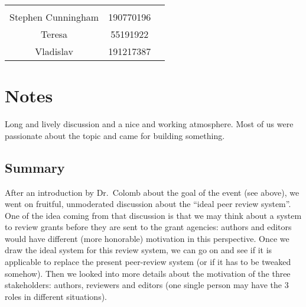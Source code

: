 \documentclass[]{article}
\begin{document}
\begin{longtable}[c]{@{}ccc@{}}
\begin{minipage}[t]{0.13\columnwidth}\centering\strut
\strut\end{minipage}\tabularnewline
\begin{minipage}[t]{0.24\columnwidth}\centering\strut
Stephen Cunningham
\strut\end{minipage} &
\begin{minipage}[t]{0.13\columnwidth}\centering\strut
190770196
\strut\end{minipage} &
\begin{minipage}[t]{0.13\columnwidth}\centering\strut
\strut\end{minipage}\tabularnewline
\begin{minipage}[t]{0.24\columnwidth}\centering\strut
Teresa
\strut\end{minipage} &
\begin{minipage}[t]{0.13\columnwidth}\centering\strut
55191922
\strut\end{minipage} &
\begin{minipage}[t]{0.13\columnwidth}\centering\strut
\strut\end{minipage}\tabularnewline
\begin{minipage}[t]{0.24\columnwidth}\centering\strut
Vladislav
\strut\end{minipage} &
\begin{minipage}[t]{0.13\columnwidth}\centering\strut
191217387
\strut\end{minipage} &
\begin{minipage}[t]{0.13\columnwidth}\centering\strut
\strut\end{minipage}\tabularnewline
\bottomrule
\end{longtable}

\section{Notes}\label{notes}

Long and lively discussion and a nice and working atmosphere. Most of us
were passionate about the topic and came for building something.

\subsection{Summary}\label{summary}

After an introduction by Dr.~Colomb about the goal of the event (see
above), we went on fruitful, unmoderated discussion about the ``ideal
peer review system''. One of the idea coming from that discussion is
that we may think about a system to review grants before they are sent
to the grant agencies: authors and editors would have different (more
honorable) motivation in this perspective. Once we draw the ideal system
for this review system, we can go on and see if it is applicable to
replace the present peer-review system (or if it has to be tweaked
somehow). Then we looked into more details about the motivation of the
three stakeholders: authors, reviewers and editors (one single person
may have the 3 roles in different situations).
\end{document}

